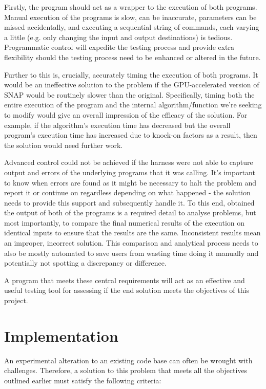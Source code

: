 \documentclass[conference]{IEEEtran}
\begin{document}
Firstly, the program should act as a wrapper to the execution of both programs. Manual execution of the programs is slow, can be inaccurate, parameters can be missed accidentally, and executing a sequential string of commands, each varying a little (e.g. only changing the input and output destinations) is tedious. Programmatic control will expedite the testing process and provide extra flexibility should the testing process need to be enhanced or altered in the future.

Further to this is, crucially, accurately timing the execution of both programs. It would be an ineffective solution to the problem if the GPU-accelerated version of SNAP would be routinely slower than the original. Specifically, timing both the entire execution of the program and the internal algorithm/function we're seeking to modify would give an overall impression of the efficacy of the solution. For example, if the algorithm's execution time has decreased but the overall program's execution time has increased due to knock-on factors as a result, then the solution would need further work.

Advanced control could not be achieved if the harness were not able to capture output and errors of the underlying programs that it was calling. It's important to know when errors are found as it might be necessary to halt the problem and report it or continue on regardless depending on what happened - the solution needs to provide this support and subsequently handle it. To this end, obtained the output of both of the programs is a required detail to analyse problems, but most importantly, to compare the final numerical results of the execution on identical inputs to ensure that the results are the same. Inconsistent results mean an improper, incorrect solution. This comparison and analytical process needs to also be mostly automated to save users from wasting time doing it manually and potentially not spotting a discrepancy or difference.

A program that meets these central requirements will act as an effective and useful testing tool for assessing if the end solution meets the objectives of this project.



\section{Implementation}
\label{sec:implementation}

An experimental alteration to an existing code base can often be wrought with challenges. Therefore, a solution to this problem that meets all the objectives outlined earlier must satisfy the following criteria:
\end{document}
